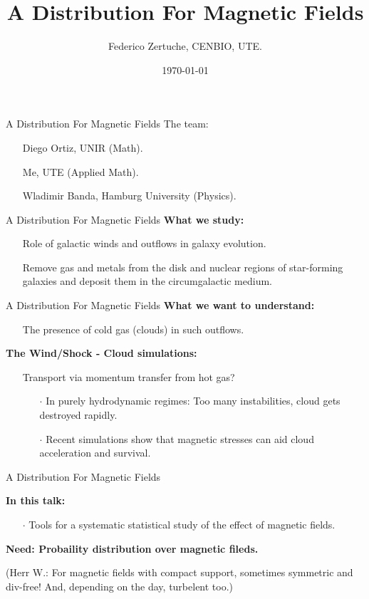 \documentclass{beamer}
\title{A Distribution For Magnetic Fields}
\author{Federico Zertuche, CENBIO, UTE.}
\date{\today}
\begin{document}
\begin{frame}
\titlepage
\end{frame}

\begin{frame}{A Distribution For Magnetic Fields}
The team:
\begin{itemize}
  \item[] Diego Ortiz, UNIR (Math).
  \item[] Me, UTE (Applied Math).
  \item[] Wladimir Banda, Hamburg University (Physics).
\end{itemize}
\end{frame}


\begin{frame}{A Distribution For Magnetic Fields}
 \textbf{What we study:}
 \begin{itemize}
  \setlength\itemsep{1em}
  \item[] Role of galactic winds and outflows in galaxy evolution.
  \item[] Remove gas and metals from the disk and nuclear regions of star-forming galaxies and deposit them in the circumgalactic medium.
\end{itemize}
\end{frame}


\begin{frame}{A Distribution For Magnetic Fields}
  \textbf{What we want to understand:}
\begin{itemize}
  \setlength\itemsep{1em}
  \item[] The presence of cold gas (clouds) in such outflows.
\end{itemize}


\textbf{The Wind/Shock - Cloud simulations:}
\begin{itemize}
  \item[] Transport via momentum transfer from hot gas?
  \begin{itemize}
    \item[$\cdot$] In purely hydrodynamic regimes: Too many instabilities, cloud gets destroyed rapidly.
    \item[$\cdot$] Recent simulations show that magnetic stresses can aid cloud acceleration and survival.
  \end{itemize}
\end{itemize}
\end{frame}

\begin{frame}{A Distribution For Magnetic Fields}

  \textbf{In this talk:}
  \begin{itemize}
    \setlength\itemsep{1em}
    \item[$\cdot$] Tools for a systematic statistical study of the effect of magnetic fields.
  \end{itemize}

  \vspace{1em}
  \textbf{Need: Probaility distribution over magnetic fileds.}

  (Herr W.: For magnetic fields with compact support, sometimes symmetric and div-free! And, depending on the day, turbelent too.)

\end{frame}
\end{document}
